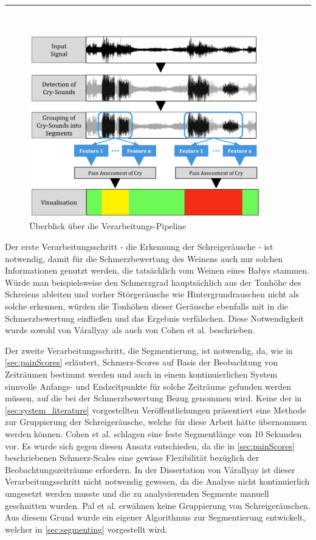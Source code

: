 \noindent\rule{\linewidth}{0.3pt} \\

\begin{figure}[h]
	\centering
	\includegraphics[width=0.9\textwidth]{bilder/konzept08.png}
	\caption{Überblick über die Verarbeitungs-Pipeline}
	\label{img:architecture-overview}
\end{figure}


Der erste Verarbeitungsschritt - die Erkennung der Schreigeräusche - ist notwendig, damit für die Schmerzbewertung des Weinens auch nur solchen Informationen genutzt werden, die tatsächlich vom Weinen eines Babys stammen. Würde man beispielsweise den Schmerzgrad hauptsächlich aus der Tonhöhe des Schreiens ableiten und vorher Störgeräusche wie Hintergrundrauschen nicht als solche erkennen, würden die Tonhöhen dieser Geräusche ebenfalls mit in die Schmerzbewertung einfließen und das Ergebnis verfälschen. Diese Notwendigkeit wurde sowohl von Várallyay \cite{cry_thesis} als auch von Cohen et al. \cite{cohenCry} beschrieben. 

Der zweite Verarbeitungsschritt, die Segmentierung, ist notwendig, da, wie in \autoref{sec:painScores} erläutert, Schmerz-Scores auf Basis der Beobachtung von Zeiträumen bestimmt werden und auch in einem kontinuierlichen System sinnvolle Anfangs- und Endzeitpunkte für solche Zeiträume gefunden werden müssen, auf die bei der Schmerzbewertung Bezug genommen wird. Keine der in \autoref{sec:system_literature} vorgestellten Veröffentlichungen präsentiert eine Methode zur Gruppierung der Schreigeräusche, welche für diese Arbeit hätte übernommen werden können. Cohen et al. \cite{cohenCry} schlagen eine feste Segmentlänge von 10 Sekunden vor. Es wurde sich gegen diesen Ansatz entschieden, da die in \autoref{sec:painScores} beschriebenen Schmerz-Scales eine gewisse Flexibilität bezüglich der Beobachtungszeiträume erfordern. In der Dissertation von Várallyay \cite{cry_thesis} ist dieser Verarbeitungsschritt nicht notwendig gewesen, da die Analyse nicht kontinuierlich umgesetzt werden musste und die zu analysierenden Segmente manuell geschnitten wurden. Pal et al. \cite{palEmotion} erwähnen keine Gruppierung von Schreigeräuschen. Aus diesem Grund wurde ein eigener Algorithmus zur Segmentierung entwickelt, welcher in \autoref{sec:segmenting} vorgestellt wird.


